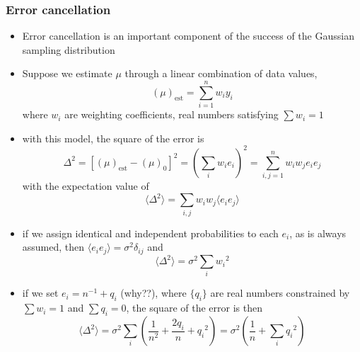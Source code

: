 \documentclass[../jaynes_prob_theory_notes.tex]{subfiles}
\begin{document}
            \subsubsection{Error cancellation}
                \begin{itemize}
                    \item Error cancellation is an important component of the success of the Gaussian sampling distribution
                    \item Suppose we estimate $\mu$ through a linear combination of data values,
                        \begin{equation*}
                            {(\mu)}_{\mathrm{est}} = \sum^{n}_{i=1}w_i y_i
                        \end{equation*}
                        where $w_i$ are weighting coefficients, real numbers satisfying $\sum w_i = 1$
                    \item with this model, the square of the error is
                        \begin{equation*}
                            {\Delta}^2 = {[{(\mu)}_{\mathrm{est}} - {{(\mu)}_0}]}^2 = {\left( \sum_i w_i e_i \right)}^2 = \sum^{n}_{i,j=1} w_i w_j e_i e_j
                        \end{equation*}
                        with the expectation value of 
                        \begin{equation*}
                            \langle {\Delta}^2 \rangle = \sum_{i,j} w_i w_j {\langle e_i e_j \rangle}
                        \end{equation*}
                    \item if we assign identical and independent probabilities to each $e_i$, as is always assumed, then $\langle e_i e_j \rangle = {\sigma}^2 \delta_{ij}$ and 
                        \begin{equation*}
                            \langle {\Delta}^2 \rangle = {\sigma}^2 \sum_{i} {w_i}^2
                        \end{equation*}
                    \item if we set $e_i = n^{-1} + q_i$ (why??), where $\{ q_i \}$ are real numbers constrained by $\sum w_i = 1$ and $\sum q_i = 0$, the square of the error is then
                        \begin{equation*}
                            \langle {\Delta}^2 \rangle = {\sigma}^2 \sum_{i} \left( \frac{1}{n^2} + \frac{2q_i}{n} + {q_i}^2 \right) = {\sigma}^2 \left( \frac{1}{n} + \sum_{i} {q_i}^2 \right)

\end{equation*}
\end{itemize}
\end{document}
